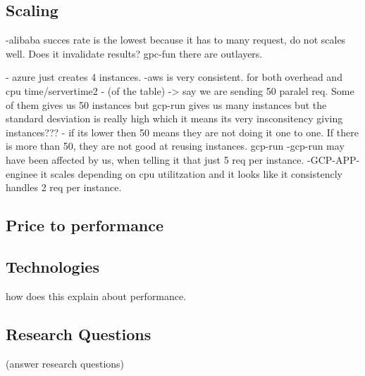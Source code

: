 \documentclass[11pt]{article}
\begin{document}
\subsection{Scaling}

-alibaba succes rate is the lowest because it has to many request, do not scales well. Does it invalidate results?
gpc-fun there are outlayers. 

- azure just creates 4 instances. 
-aws is very consistent. for both overhead and cpu time/servertime2
- (of the table) -> say we are sending 50 paralel req. Some of them gives us 50 instances but gcp-run gives us many instances but the standard desviation is really high which it means its very insconsitency giving instances???
- if its lower then 50 means they are not doing it one to one. If there is more than 50, they are not good at reusing instances. gcp-run 
-gcp-run may have been affected by us, when telling it that just 5 req per instance. 
-GCP-APP-enginee it scales depending on cpu utilitzation and it looks like it consistencly handles 2 req per instance. 

\subsection{Price to performance}


\subsection{Technologies}
how does this explain about performance. 

\subsection{Research Questions}
(answer research questions)
\end{document}
